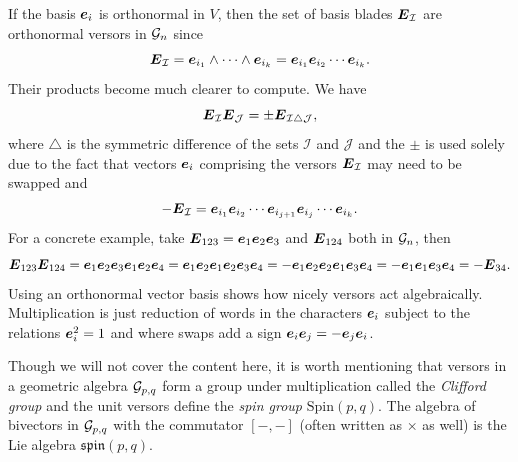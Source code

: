 \documentclass{article}
\begin{document}
If the basis $\boldsymbol{e}_i$ is orthonormal in $V$, then the set of basis blades $\boldsymbol{E}_\mathcal{I}$ are orthonormal versors in $\mathcal{G}_n$ since
\begin{equation}
\boldsymbol{E}_\mathcal{I} = \boldsymbol{e}_{i_1}\wedge \cdots \wedge \boldsymbol{e}_{i_k} = \boldsymbol{e}_{i_1} \boldsymbol{e}_{i_2} \cdots \boldsymbol{e}_{i_k}.
\end{equation}
Their products become much clearer to compute. We have
\begin{equation}
\boldsymbol{E}_\mathcal{I} \boldsymbol{E}_\mathcal{J} =  \pm \boldsymbol{E}_{\mathcal{I}\triangle \mathcal{J}},
\end{equation}
where $\triangle$ is the symmetric difference of the sets $\mathcal{I}$ and $\mathcal{J}$ and the $\pm$ is used solely due to the fact that vectors $\boldsymbol{e}_i$ comprising the versors $\boldsymbol{E}_\mathcal{I}$ may need to be swapped and
\begin{equation}
-\boldsymbol{E}_\mathcal{I} = \boldsymbol{e}_{i_1} \boldsymbol{e}_{i_2} \cdots \boldsymbol{e}_{i_{j+1}} \boldsymbol{e}_{i_j}\cdots \boldsymbol{e}_{i_k}.
\end{equation}
For a concrete example, take $\boldsymbol{E}_{123}=\boldsymbol{e}_1\boldsymbol{e}_2\boldsymbol{e}_3$ and $\boldsymbol{E}_{124}$ both in $\mathcal{G}_n$, then
\begin{equation}
\boldsymbol{E}_{123}\boldsymbol{E}_{124}= \boldsymbol{e}_1\boldsymbol{e}_2\boldsymbol{e}_3\boldsymbol{e}_1\boldsymbol{e}_2\boldsymbol{e}_4=\boldsymbol{e}_1\boldsymbol{e}_2\boldsymbol{e}_1\boldsymbol{e}_2\boldsymbol{e}_3\boldsymbol{e}_4 = -\boldsymbol{e}_1\boldsymbol{e}_2\boldsymbol{e}_2\boldsymbol{e}_1\boldsymbol{e}_3\boldsymbol{e}_4 = -\boldsymbol{e}_1\boldsymbol{e}_1\boldsymbol{e}_3\boldsymbol{e}_4 = -\boldsymbol{E}_{34}.
\end{equation}
Using an orthonormal vector basis shows how nicely versors act algebraically. Multiplication is just reduction of words in the characters $\boldsymbol{e}_i$ subject to the relations $\boldsymbol{e}_i^2=1$ and where swaps add a sign $\boldsymbol{e}_i\boldsymbol{e}_j=-\boldsymbol{e}_j\boldsymbol{e}_i$.

\begin{remark}
Though we will not cover the content here, it is worth mentioning that versors in a geometric algebra $\mathcal{G}_{p,q}$ form a group under multiplication called the \emph{Clifford group} and the unit versors define the \emph{spin group} $\mathrm{Spin}(p,q)$. The algebra of bivectors in $\mathcal{G}_{p,q}$ with the commutator $[-,-]$ (often written as $\times$ as well) is the Lie algebra $\mathfrak{spin}(p,q)$.
\end{remark}
\end{document}
